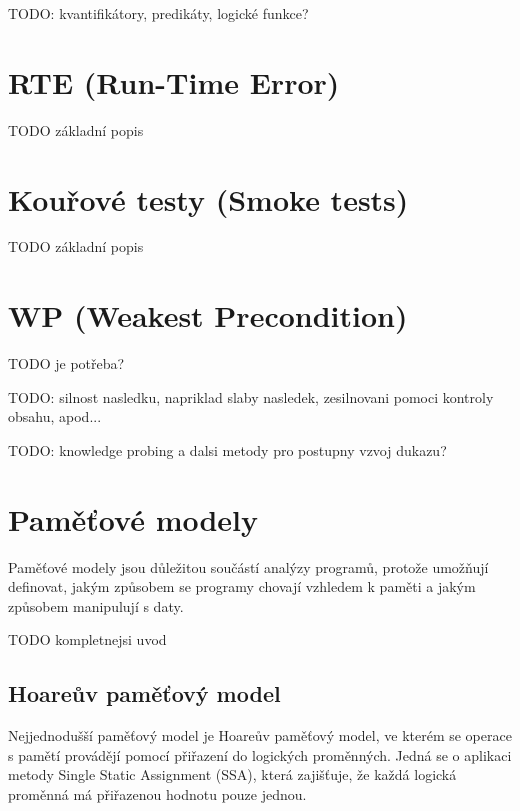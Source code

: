 TODO: kvantifikátory, predikáty, logické funkce?



\section{RTE (Run-Time Error)}
\label{sec:frama-c-rte}

TODO základní popis


\section{Kouřové testy (Smoke tests)}
\label{sec:frama-c-smoke-tests}

TODO základní popis


\section{WP (Weakest Precondition)}
\label{sec:frama-c-wp}

TODO je potřeba?

TODO: silnost nasledku, napriklad slaby nasledek, zesilnovani pomoci kontroly obsahu, apod...

TODO: knowledge probing a dalsi metody pro postupny vzvoj dukazu?


\section{Paměťové modely}
\label{sec:frama-c-pametove-modely}


Paměťové modely jsou důležitou součástí analýzy programů,
protože umožňují definovat, jakým způsobem se programy chovají
vzhledem k paměti a jakým způsobem manipulují s daty.

TODO kompletnejsi uvod

\subsection{Hoareův paměťový model}
\label{subsec:hoareuv-pametovy-model}

Nejjednodušší paměťový model je Hoareův paměťový model,
ve kterém se operace s pamětí provádějí pomocí přiřazení do logických proměnných.
Jedná se o aplikaci metody Single Static Assignment (SSA),
která zajišťuje, že každá logická proměnná má přiřazenou hodnotu pouze jednou.

